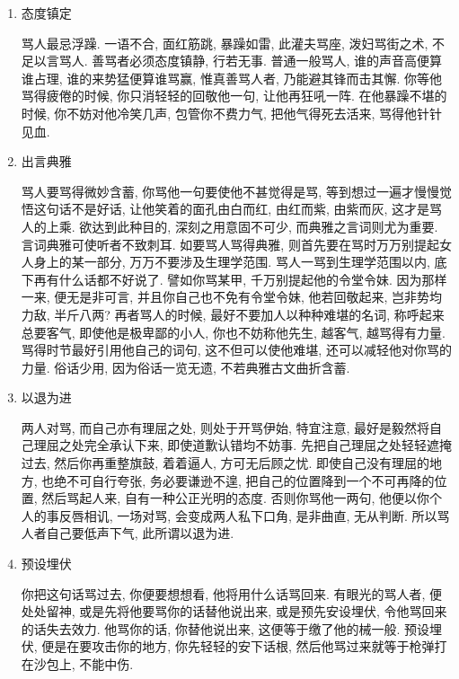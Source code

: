 \begin{enumerate}
\item 态度镇定

\hspace{1.8em}骂人最忌浮躁. 一语不合, 面红筋跳, 暴躁如雷, 此灌夫骂座, 泼妇骂街之术, 不足以言骂人. 善骂者必须态度镇静, 行若无事. 普通一般骂人, 谁的声音高便算谁占理, 谁的来势猛便算谁骂赢, 惟真善骂人者, 乃能避其锋而击其懈. 你等他骂得疲倦的时候, 你只消轻轻的回敬他一句, 让他再狂吼一阵. 在他暴躁不堪的时候, 你不妨对他冷笑几声, 包管你不费力气, 把他气得死去活来, 骂得他针针见血. 

\item 出言典雅

\hspace{1.8em}骂人要骂得微妙含蓄, 你骂他一句要使他不甚觉得是骂, 等到想过一遍才慢慢觉悟这句话不是好话, 让他笑着的面孔由白而红, 由红而紫, 由紫而灰, 这才是骂人的上乘. 欲达到此种目的, 深刻之用意固不可少, 而典雅之言词则尤为重要. 言词典雅可使听者不致刺耳. 如要骂人骂得典雅, 则首先要在骂时万万别提起女人身上的某一部分, 万万不要涉及生理学范围. 骂人一骂到生理学范围以内, 底下再有什么话都不好说了. 譬如你骂某甲, 千万别提起他的令堂令妹. 因为那样一来, 便无是非可言, 并且你自己也不免有令堂令妹, 他若回敬起来, 岂非势均力敌, 半斤八两? 再者骂人的时候, 最好不要加人以种种难堪的名词, 称呼起来总要客气, 即使他是极卑鄙的小人, 你也不妨称他先生, 越客气, 越骂得有力量. 骂得时节最好引用他自己的词句, 这不但可以使他难堪, 还可以减轻他对你骂的力量. 俗话少用, 因为俗话一览无遗, 不若典雅古文曲折含蓄. 

\item 以退为进

\hspace{1.8em}两人对骂, 而自己亦有理屈之处, 则处于开骂伊始, 特宜注意, 最好是毅然将自己理屈之处完全承认下来, 即使道歉认错均不妨事. 先把自己理屈之处轻轻遮掩过去, 然后你再重整旗鼓, 着着逼人, 方可无后顾之忧. 即使自己没有理屈的地方, 也绝不可自行夸张, 务必要谦逊不遑, 把自己的位置降到一个不可再降的位置, 然后骂起人来, 自有一种公正光明的态度. 否则你骂他一两句, 他便以你个人的事反唇相讥, 一场对骂, 会变成两人私下口角, 是非曲直, 无从判断. 所以骂人者自己要低声下气, 此所谓以退为进. 

\item 预设埋伏

\hspace{1.8em}你把这句话骂过去, 你便要想想看, 他将用什么话骂回来. 有眼光的骂人者, 便处处留神, 或是先将他要骂你的话替他说出来, 或是预先安设埋伏, 令他骂回来的话失去效力. 他骂你的话, 你替他说出来, 这便等于缴了他的械一般. 预设埋伏, 便是在要攻击你的地方, 你先轻轻的安下话根, 然后他骂过来就等于枪弹打在沙包上, 不能中伤. 


\end{enumerate}
